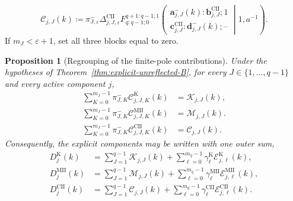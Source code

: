 \documentclass[10pt]{amsart}
\theoremstyle{plain}
\newtheorem{proposition}[theorem]{Proposition}
\theoremstyle{definition}
\theoremstyle{remark}
\begin{document}
\begin{equation}
 \mathscr C_{j,J}(k)
 \coloneq \pi_{J,\varepsilon}^{-}
 \Delta_{j,J,\varepsilon}^{\mathrm{CII}}
 F_{q:q-1;0}^{q+1:q-1;1}
 \left(
 \begin{matrix}
  \boldsymbol a_{j,J}^{-}(k):
  \boldsymbol b_{j,J}^{\mathrm{CII}};1\\
  \boldsymbol c_{j,J}^{\mathrm{CII}}:
  \boldsymbol d_{j,J}^{-}(k);\text{--}
 \end{matrix}
 \middle|1,a^{-1}\right).
 \label{eq:CII-compact-finite-pole-block}
\end{equation}
If $m_J<\varepsilon+1$, set all three blocks equal to zero.

\begin{proposition}[Regrouping of the finite-pole contributions]
\label{prop:compact-unreflected-finite-poles}
Under the hypotheses of
Theorem~\ref{thm:explicit-unreflected-B}, for every
\(J\in\{1,\ldots,q-1\}\) and every active component $j$,
\begin{align}
 \sum_{K=0}^{m_J-1}\pi_{J,K}^{-}
 \mathcal C_{j,J,K}^{\mathrm K}(k)
 &=\mathscr K_{j,J}(k),
 \label{eq:K-compact-finite-pole-identity}\\
 \sum_{K=0}^{m_J-1}\pi_{J,K}^{-}
 \mathcal C_{j,J,K}^{\mathrm{MII}}(k)
 &=\mathscr M_{j,J}(k).
 \label{eq:MII-compact-finite-pole-identity}\\
 \sum_{K=0}^{m_J-1}\pi_{J,K}^{-}
 \mathcal C_{j,J,K}^{\mathrm{CII}}(k)
 &=\mathscr C_{j,J}(k).
 \label{eq:CII-compact-finite-pole-identity}
\end{align}
Consequently, the explicit components may be written with one outer sum,
\begin{align}
 D_j^{\mathrm K}(k)
 &=\sum_{J=1}^{q-1}\mathscr K_{j,J}(k)
 +\sum_{\ell=0}^{m_q-1}\gamma_\ell^{\mathrm K}
   \mathcal E_{j,\ell}^{\mathrm K}(k),\\
 D_j^{\mathrm{MII}}(k)
 &=\sum_{J=1}^{q-1}\mathscr M_{j,J}(k)
 +\sum_{\ell=0}^{m_q-1}\gamma_\ell^{\mathrm{MII}}
   \mathcal E_{j,\ell}^{\mathrm{MII}}(k),\\
 D_j^{\mathrm{CII}}(k)
 &=\sum_{J=1}^{q-1}\mathscr C_{j,J}(k)
 +\sum_{\ell=0}^{m_q-1}\gamma_\ell^{\mathrm{CII}}
   \mathcal E_{j,\ell}^{\mathrm{CII}}(k).
\end{align}
\end{proposition}
\end{document}
